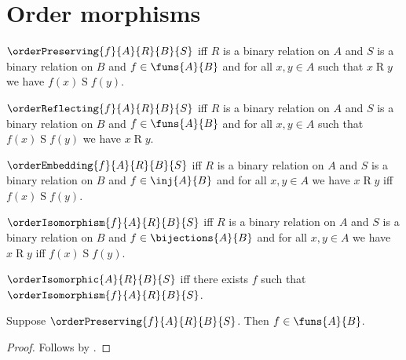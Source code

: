 \section{Order morphisms}





\begin{definition}\label{order_preserving}
    $\orderPreserving{f}{A}{R}{B}{S}$ iff
        $R$ is a binary relation on $A$ and
        $S$ is a binary relation on $B$ and
        $f\in\funs{A}{B}$ and
        for all $x,y\in A$ such that $x\mathrel{R}y$ we have
            $f(x)\mathrel{S}f(y)$.
\end{definition}

\begin{definition}\label{order_reflecting}
    $\orderReflecting{f}{A}{R}{B}{S}$ iff
        $R$ is a binary relation on $A$ and
        $S$ is a binary relation on $B$ and
        $f\in\funs{A}{B}$ and
        for all $x,y\in A$ such that $f(x)\mathrel{S}f(y)$ we have
            $x\mathrel{R}y$.
\end{definition}

\begin{definition}\label{order_embedding}
    $\orderEmbedding{f}{A}{R}{B}{S}$ iff
        $R$ is a binary relation on $A$ and
        $S$ is a binary relation on $B$ and
        $f\in\inj{A}{B}$ and
        for all $x,y\in A$ we have
            $x\mathrel{R}y$ iff $f(x)\mathrel{S}f(y)$.
\end{definition}

\begin{definition}\label{order_isomorphism}
    $\orderIsomorphism{f}{A}{R}{B}{S}$ iff
        $R$ is a binary relation on $A$ and
        $S$ is a binary relation on $B$ and
        $f\in\bijections{A}{B}$ and
        for all $x,y\in A$ we have
            $x\mathrel{R}y$ iff $f(x)\mathrel{S}f(y)$.
\end{definition}

\begin{definition}\label{order_isomorphic}
    $\orderIsomorphic{A}{R}{B}{S}$ iff there exists $f$ such that
        $\orderIsomorphism{f}{A}{R}{B}{S}$.
\end{definition}

\begin{proposition}\label{order_preserving_type}
    Suppose $\orderPreserving{f}{A}{R}{B}{S}$.
    Then $f\in\funs{A}{B}$.
\end{proposition}
\begin{proof}
    Follows by .
\end{proof}

